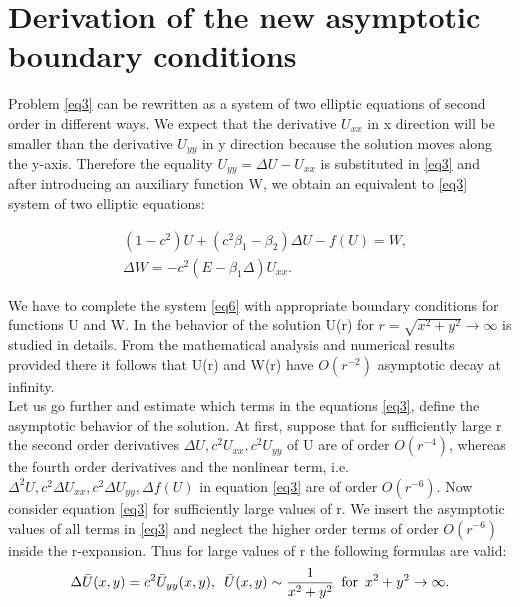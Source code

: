 \documentclass[12pt]{article}
\theoremstyle{theorem}
\theoremstyle{defi}
\begin{document}
\section{Derivation of the new asymptotic boundary conditions }

Problem \eqref{eq3} can be rewritten as a system of two elliptic equations of second order in different ways. We expect that the derivative  $U_{xx}$ in x direction will be smaller than the derivative $U_{yy}$  in y direction because the solution moves along the y-axis. Therefore the equality $U_{yy} = \Delta U - U_{xx}$  is substituted in \eqref{eq3} and after introducing an auxiliary function W, we obtain an equivalent to \eqref{eq3} system of two elliptic equations:

\begin{equation}\label{eq6}
\begin{split}
&(1-c^2) U + ( c^2\beta_1 -  \beta_2) \Delta U  - f (U) = W, \\ 
&\Delta W =  -c^2  (E- \beta_1 \Delta) U_{xx}. 
\end{split}
\end{equation}

We have to complete the system \eqref{eq6} with appropriate boundary conditions for functions U and W. In \cite{ref6} the behavior of the solution U(r) for  $ r=\sqrt{x^2 + y^2}\rightarrow \infty$ is studied in details. From the mathematical analysis and numerical results provided there it follows that U(r) and W(r) have  $O(r^{-2})$ asymptotic decay at infinity. 
\\
	Let us go further and estimate which terms in the equations \eqref{eq3},  define the asymptotic behavior of the solution. At first, suppose that for sufficiently large r the second order derivatives $\Delta U , c^2U_{xx} , c^2U_{yy}$  of U are of order  $O(r^{-4})$, whereas the fourth order derivatives and the nonlinear term, i.e.  $\Delta^2 U , c^2\Delta U_{xx} , c^2\Delta U_{yy}, \Delta f(U)$    in equation \eqref{eq3} are of order $O(r^{-6})$.  
Now consider equation \eqref{eq3} for sufficiently large values of r. We insert the asymptotic values of all terms in \eqref{eq3} and neglect the higher order terms of order $O(r^{-6})$ inside the r-expansion. Thus for large values of r the following formulas are valid:
\begin{equation}
 \Delta \bar{U}(x,y) =   c^2   \bar{U}_{yy}(x,y) , \enskip  \bar{U}(x,y) \sim \frac{1}{x^2 + y^2} \enskip \text{for} \enskip x^2 + y^2 \rightarrow \infty  . \label{eq8}
\end{equation}
\end{document}
